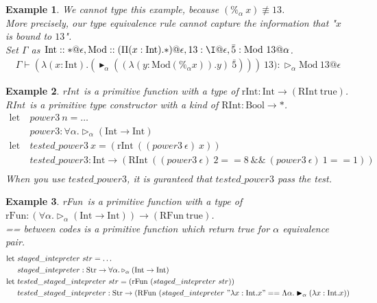 \documentclass[9pt, a4paper]{extarticle}
\theoremstyle{break}
\newtheorem{ex}{Example}
\newcommand{\G}{\Gamma}
\newcommand{\V}{\vdash}
\newcommand{\TW}{\triangleright}
\newcommand{\TB}{\blacktriangleright}
\newcommand{\E}{\equiv}
\begin{document}
\begin{ex}
    \newcommand{\M}{\textrm{Mod}}
    \newcommand{\I}{\textrm{Int}}
    \newcommand{\GF}{\textrm{GF}}
    We cannot type this example, because $(\%_\alpha\ x) \not\E 13$.\\
    More precisely, our type equivalence rule cannot capture the information that "$x$ is bound to $13$".\\

    Set $\G$ as $\I::*@\epsilon,\M::(\Pi (x:\I).*)@\epsilon,13:\I@\epsilon,\bar{5}:\M\ 13@\alpha$.
    \begin{align*}
        \G\V
        (\lambda (x:\I).
        (\TB_\alpha ((\lambda (y:\M (\%_\alpha x)).y)\ \bar{5})))\ 13):\TW_\alpha \M\ 13@\epsilon
    \end{align*}
\end{ex}

\fi

\begin{ex}
    \newcommand{\I}{\textrm{Int}}
    \newcommand{\B}{\textrm{Bool}}
    \newcommand{\RI}{\textrm{RInt}}
    \newcommand{\rI}{\textrm{rInt}}
    \rI\ is a primitive function with a type of $\rI : \I \to (\RI\ \text{true})$.\\
    \RI\ is a primitive type constructor with a kind of $\RI : \B \to *$.
    \begin{align*}
        \text{let}\ & power3\ n = \hdots \\
        & power3 : \forall\alpha. \TW_\alpha(\I \to \I) \\
        \text{let}\ & tested\_power3\ x = (\rI\ ((power3\ \epsilon)\ x)) \\
        & tested\_power3 : \I \to (\RI\ ((power3\ \epsilon)\ 2 == 8\ \&\&\ (power3\ \epsilon)\ 1 == 1)) \\
    \end{align*}
    When you use $tested\_power3$, it is guranteed that $tested\_power3$ pass the test.
\end{ex}

\begin{ex}
    \newcommand{\I}{\textrm{Int}}
    \newcommand{\Exp}{\textrm{Str}}
    \newcommand{\RI}{\textrm{RFun}}
    \newcommand{\rI}{\textrm{rFun}}
    \rI\ is a primitive function with a type of $\rI : (\forall\alpha.\TW_\alpha(\I \to \I)) \to (\RI\ \text{true})$.\\
    == between codes is a primitive function which return true for $\alpha$ equivalence pair.
    \begin{align*}
        \text{let}\ & staged\_intepreter\ str = \hdots \\
        & staged\_intepreter : \Exp \to \forall\alpha.\TW_\alpha(\I \to \I) \\
        \text{let}\ & tested\_staged\_intepreter\ str = (\rI\ (staged\_intepreter\ str)) \\
        & tested\_staged\_intepreter : \Exp \to (\RI\ (staged\_intepreter\ "\lambda x:\I.x" == \Lambda\alpha.\TB_\alpha (\lambda x:\I.x)) \\
    \end{align*}
\end{ex}
\end{document}
